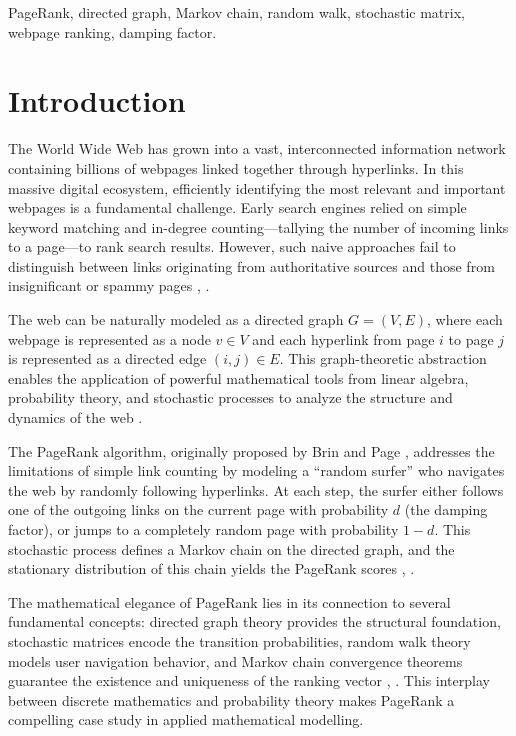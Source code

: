 \documentclass[conference]{IEEEtran}
\begin{document}
\begin{IEEEkeywords}
PageRank, directed graph, Markov chain, random walk, stochastic matrix, webpage ranking, damping factor.
\end{IEEEkeywords}

\section{Introduction}
The World Wide Web has grown into a vast, interconnected information network containing billions of webpages linked together through hyperlinks. In this massive digital ecosystem, efficiently identifying the most relevant and important webpages is a fundamental challenge. Early search engines relied on simple keyword matching and in-degree counting---tallying the number of incoming links to a page---to rank search results. However, such naive approaches fail to distinguish between links originating from authoritative sources and those from insignificant or spammy pages \cite{b1}, \cite{b2}.

The web can be naturally modeled as a directed graph $G = (V, E)$, where each webpage is represented as a node $v \in V$ and each hyperlink from page $i$ to page $j$ is represented as a directed edge $(i, j) \in E$. This graph-theoretic abstraction enables the application of powerful mathematical tools from linear algebra, probability theory, and stochastic processes to analyze the structure and dynamics of the web \cite{b3}.

The PageRank algorithm, originally proposed by Brin and Page \cite{b1}, addresses the limitations of simple link counting by modeling a ``random surfer'' who navigates the web by randomly following hyperlinks. At each step, the surfer either follows one of the outgoing links on the current page with probability $d$ (the damping factor), or jumps to a completely random page with probability $1 - d$. This stochastic process defines a Markov chain on the directed graph, and the stationary distribution of this chain yields the PageRank scores \cite{b4}, \cite{b5}.

The mathematical elegance of PageRank lies in its connection to several fundamental concepts: directed graph theory provides the structural foundation, stochastic matrices encode the transition probabilities, random walk theory models user navigation behavior, and Markov chain convergence theorems guarantee the existence and uniqueness of the ranking vector \cite{b6}, \cite{b7}. This interplay between discrete mathematics and probability theory makes PageRank a compelling case study in applied mathematical modelling.
\end{document}
